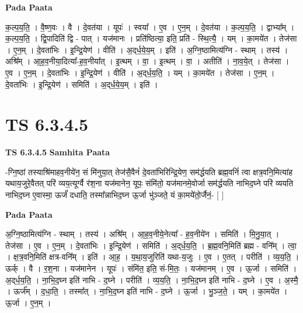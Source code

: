 \documentclass[17pt]{extarticle}
\begin{document}
\textbf{Pada Paata} \newline

क॒ल्प॒य॒ति॒ । वै॒ष्ण॒वः । वै । दे॒वत॑या । यूपः॑ । स्वया᳚ । ए॒व । ए॒न॒म् । दे॒वत॑या । क॒ल्प॒य॒ति॒ । द्वाभ्या᳚म् । क॒ल्प॒य॒ति॒ । द्वि॒पादिति॑ द्वि - पात् । यज॑मानः । प्रति॑ष्ठित्या॒ इति॒ प्रति॑ - स्थि॒त्यै॒ । यम् । का॒मये॑त । तेज॑सा । ए॒न॒म् । दे॒वता॑भिः । इ॒न्द्रि॒येण॑ । वीति॑ । अ॒द्‌र्ध॒ये॒य॒म् । इति॑ । अ॒ग्नि॒ष्ठामित्य॑ग्नि - स्थाम् । तस्य॑ । अश्रि᳚म् । आ॒ह॒व॒नीया॒दित्या᳚-ह॒व॒नीया᳚त् । इ॒त्थम् । वा॒ । इ॒त्थम् । वा॒ । अतीति॑ । ना॒व॒ये॒त् । तेज॑सा । ए॒व । ए॒न॒म् । दे॒वता॑भिः । इ॒न्द्रि॒येण॑ । वीति॑ । अ॒द्‌र्ध॒य॒ति॒ । यम् । का॒मये॑त । तेज॑सा । ए॒न॒म् । दे॒वता॑भिः । इ॒न्द्रि॒येण॑ । समिति॑ । अ॒द्‌र्ध॒ये॒य॒म् । इति॑ ।  \newline





\section{ TS 6.3.4.5 }

\textbf{TS 6.3.4.5 } \newline
\textbf{Samhita Paata} \newline

-ग्नि॒ष्ठां तस्याश्रि॑माहव॒नीये॑न॒ सं मि॑नुया॒त् तेज॑सै॒वैनं॑ दे॒वता॑भिरिन्द्रि॒येण॒ सम॑र्द्धयति ब्रह्म॒वनिं॑ त्वा क्षत्र॒वनि॒मित्या॑ह यथाय॒जुरे॒वैतत् परि॑ व्यय॒त्यूर्ग्वै र॑श॒ना यज॑मानेन॒ यूपः॒ संमि॑तो॒ यज॑मानमे॒वोर्जा सम॑र्द्धयति नाभिद॒घ्ने परि॑ व्ययति नाभिद॒घ्न ए॒वास्मा॒ ऊर्जं॑ दधाति॒ तस्मा᳚न्नाभिद॒घ्न ऊ॒र्जा भु॑ञ्जते॒ यं का॒मये॑तो॒र्जैनं॒- [  ] \newline

\textbf{Pada Paata} \newline

अ॒ग्नि॒ष्ठामित्य॑ग्नि - स्थाम् । तस्य॑ । अश्रि᳚म् । आ॒ह॒व॒नीये॒नेत्या᳚ - ह॒व॒नीये॑न । समिति॑ । मि॒नु॒या॒त् । तेज॑सा । ए॒व । ए॒न॒म् । दे॒वता॑भिः । इ॒न्द्रि॒येण॑ । समिति॑ । अ॒द्‌र्ध॒य॒ति॒ । ब्र॒ह्म॒वनि॒मिति॑ ब्रह्म - वनि᳚म् । त्वा॒ । क्ष॒त्र॒वनि॒मिति॑ क्षत्र-वनि᳚म् । इति॑ । आ॒ह॒ । य॒था॒य॒जुरिति॑ यथा-य॒जुः । ए॒व । ए॒तत् । परीति॑ । व्य॒य॒ति॒ । ऊर्क् । वै । र॒श॒ना । यज॑मानेन । यूपः॑ । संमि॑त॒ इति॒ सं-मि॒तः॒ । यज॑मानम् । ए॒व । ऊ॒र्जा । समिति॑ । अ॒द्‌र्ध॒य॒ति॒ । ना॒भि॒द॒घ्न इति॑ नाभि - द॒घ्ने । परीति॑ । व्य॒य॒ति॒ । ना॒भि॒द॒घ्न इति॑ नाभि - द॒घ्ने । ए॒व । अ॒स्मै॒ । ऊर्ज᳚म् । द॒धा॒ति॒ । तस्मा᳚त् । ना॒भि॒द॒घ्न इति॑ नाभि - द॒घ्ने । ऊ॒र्जा । भु॒ञ्ज॒ते॒ । यम् । का॒मये॑त । ऊ॒र्जा । ए॒न॒म् ।  \newline
\end{document}
